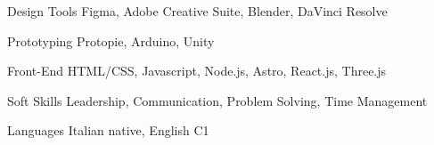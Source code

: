 

\begin{cvskills}

  \cvskill
    {Design Tools} %
    {Figma, Adobe Creative Suite, Blender, DaVinci Resolve} %

  \cvskill
    {Prototyping} %
    {Protopie, Arduino, Unity} %

  \cvskill
    {Front-End} %
    {HTML/CSS, Javascript, Node.js, Astro, React.js, Three.js} %

  \cvskill
    {Soft Skills} %
    {Leadership, Communication, Problem Solving, Time Management} %

  \cvskill
    {Languages} %
    {Italian native, English C1} %

\end{cvskills}
